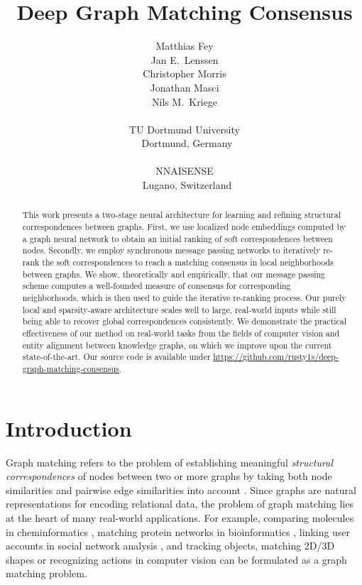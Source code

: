 \documentclass{article}
\title{Deep Graph Matching Consensus}
\author{Matthias Fey\\
\And \hspace{-0.4cm}
Jan E.~Lenssen\\
\And \hspace{-0.4cm}
Christopher Morris\\
\And \hspace{-0.4cm}
Jonathan Masci\\
\And \hspace{-0.4cm}
Nils M.~Kriege\\
\And \vspace{-0.5cm}
\\
TU Dortmund University\\
\,\,\,Dortmund, Germany\\
\And \vspace{-0.5cm}
\\
NNAISENSE\\
\,\,\,Lugano, Switzerland\\
}
\begin{document}
\maketitle


\begin{abstract}
This work presents a two-stage neural architecture for learning and refining structural correspondences between graphs.
First, we use localized node embeddings computed by a graph neural network to obtain an initial ranking of soft correspondences between nodes.
Secondly, we employ synchronous message passing networks to iteratively re-rank the soft correspondences to reach a matching consensus in local neighborhoods between graphs.
We show, theoretically and empirically, that our message passing scheme computes a well-founded measure of consensus for corresponding neighborhoods, which is then used to guide the iterative re-ranking process.
Our purely local and sparsity-aware architecture scales well to large, real-world inputs while still being able to recover global correspondences consistently.
We demonstrate the practical effectiveness of our method on real-world tasks from the fields of computer vision and entity alignment between knowledge graphs, on which we improve upon the current state-of-the-art.
Our source code is available under \url{https://github.com/rusty1s/deep-graph-matching-consensus}.
\end{abstract}

\section{Introduction}\label{sec:introduction}

Graph matching refers to the problem of establishing meaningful \emph{structural correspondences} of nodes between two or more graphs by taking both node similarities and pairwise edge similarities into account \citep{Wang/etal/2019}.
Since graphs are natural representations for encoding relational data, the problem of graph matching lies at the heart of many real-world applications.
For example, comparing molecules in cheminformatics \citep{Kriege/etal/2019}, matching protein networks in bioinformatics \citep{Sharan/Ideker/2006,Singh/etal/2008}, linking user accounts in social network analysis \citep{Zhang/Philip/2015}, and tracking objects, matching 2D/3D shapes or recognizing actions in computer vision \citep{Vento/Foggia/2012} can be formulated as a graph matching problem.
\end{document}
